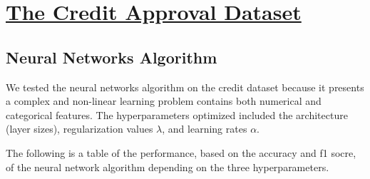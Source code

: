 \documentclass{article}
\begin{document}
\newpage




\section{\underline{The Credit Approval Dataset}}
\subsection{Neural Networks Algorithm}

We tested the neural networks algorithm on the credit dataset because it presents a  complex and non-linear learning problem contains both numerical and categorical features. The hyperparameters optimized included the architecture (layer sizes), regularization values $\lambda$, and learning rates $\alpha$. 

The following is a table of the performance, based on the accuracy and f1 socre, of the neural network algorithm depending on the three hyperparameters.  
\end{document}
